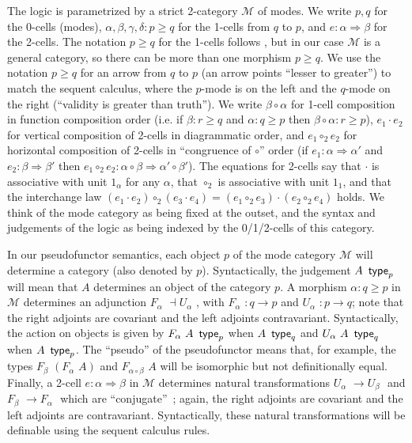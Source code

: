 \documentclass{drl-common/llncs}
\newcommand{\M}{\ensuremath{\mathcal{M}}}
\newcommand{\la}{\ensuremath{\dashv}}
\newcommand{\tc}[2]{\ensuremath{#1 \Rightarrow #2}}
\newcommand\compo[2]{\ensuremath{#1 \circ #2}}
\newcommand\compv[2]{\ensuremath{#1 \cdot #2}}
\newcommand\comph[2]{\ensuremath{#1 \mathbin{\circ_2} #2}}
\renewcommand\wftp[2]{\ensuremath{#1 \,\,\, \dsd{type}_{#2}}}
\newcommand\F[2]{\ensuremath{F_{#1} \,\, #2}}
\newcommand\U[2]{\ensuremath{U_{#1} \,\, #2}}
\begin{document}
The logic is parametrized by a strict 2-category $\M$ of modes.  We
write $p,q$ for the 0-cells (modes), $\alpha,\beta,\gamma,\delta : p \ge
q$ for the 1-cells from $q$ to $p$, and $e : \tc \alpha \beta$ for the
2-cells.  The notation $p\ge q$ for the 1-cells follows
\citep{reed09adjoint}, but in our case $\M$ is a general category, so
there can be more than one morphism $p \ge q$.  We use the notation $p
\ge q$ for an arrow from $q$ to $p$ (an arrow points ``lesser to
greater'') to match the sequent calculus, where the $p$-mode is on the
left and the $q$-mode on the right (``validity is greater than truth'').
We write \compo{\beta}{\alpha} for 1-cell composition in function
composition order (i.e. if $\beta : r \ge q$ and $\alpha : q \ge p$ then
$\compo{\beta}{\alpha} : r \ge p$), \compv{e_1}{e_2} for vertical
composition of 2-cells in diagrammatic order, and \comph{e_1}{e_2} for
horizontal composition of 2-cells in ``congruence of \compo{}{}'' order
(if $e_1 : \tc \alpha {\alpha'}$ and $e_2 : \tc \beta \beta'$ then
$\comph{e_1}{e_2} :
\tc{\compo{\alpha}{\beta}}{\compo{\alpha'}{\beta'}}$).  The equations
for 2-cells say that \compv{}{} is associative with unit $1_\alpha$ for
any $\alpha$, that \comph{}{} is associative with unit $1_1$, and that
the interchange law $\comph{(\compv{e_1}{e_2})}{(\compv{e_3}{e_4})} =
\compv{(\comph{e_1}{e_3})}{(\comph{e_2}{e_4})}$ holds.  We think of the
mode category as being fixed at the outset, and the syntax and
judgements of the logic as being indexed by the 0/1/2-cells of this
category.

In our pseudofunctor semantics, each object $p$ of the mode category
$\M$ will determine a category (also denoted by $p$). Syntactically, the
judgement \wftp{A}{p} will mean that $A$ determines an object of the
category $p$.  A morphism $\alpha : q \ge p$ in $\M$ determines an
adjunction $\F\alpha{} \la \U\alpha{}$, with $\F \alpha {} : q \to p$
and $\U \alpha {} : p \to q$; note that the right adjoints are covariant
and the left adjoints contravariant.  Syntactically, the action on
objects is given by $\wftp{\F \alpha A}{p}$ when $\wftp{A}{q}$ and
$\wftp{\U \alpha A}{q}$ when $\wftp{A}{p}$.  The ``pseudo'' of the
pseudofunctor means that, for example, the types \F{\beta}{(\F \alpha
  A)} and {\F {\compo{\alpha}{\beta}} A} will be isomorphic but not
definitionally equal.  Finally, a 2-cell $e:\tc\alpha\beta$ in $\M$
determines natural transformations $\U\alpha{} \to \U\beta{}$ and
$\F\beta{}\to \F\alpha{}$ which are ``conjugate''~\citep[\S
  IV.7]{maclane98working}; again, the right adjoints are covariant and
the left adjoints are contravariant.  Syntactically, these natural
transformations will be definable using the sequent calculus rules.
\end{document}
